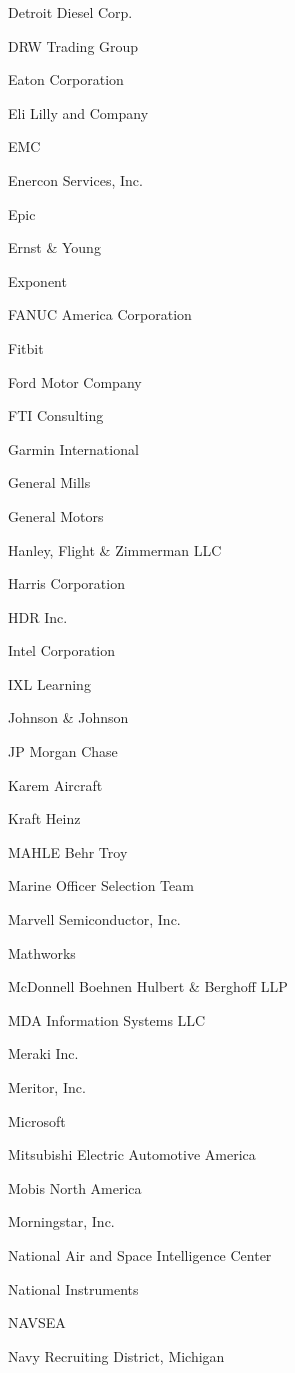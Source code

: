 \documentclass[twoside]{article}
\begin{document}
\begin{center}
\begin{multicols}{5}
\begin{FlushLeft}
\begin{compactitem}
\item Detroit Diesel Corp.
\item DRW Trading Group
\item Eaton Corporation
\item Eli Lilly and Company
\item EMC
\item Enercon Services, Inc.
\item Epic
\item Ernst \& Young
\item Exponent
\item FANUC America Corporation
\item Fitbit
\item Ford Motor Company
\item FTI Consulting
\item Garmin International
\item General Mills
\item General Motors
\item Hanley, Flight \& Zimmerman LLC
\item Harris Corporation
\item HDR Inc.
\item Intel Corporation
\item IXL Learning
\item Johnson \& Johnson
\item JP Morgan Chase
\item Karem Aircraft
\item Kraft Heinz
\item MAHLE Behr Troy
\item Marine Officer Selection Team
\item Marvell Semiconductor, Inc.
\item Mathworks
\item McDonnell Boehnen Hulbert \& Berghoff LLP
\item MDA Information Systems LLC
\item Meraki Inc.
\item Meritor, Inc.
\item Microsoft
\item Mitsubishi Electric Automotive America
\item Mobis North America
\item Morningstar, Inc.
\item National Air and Space Intelligence Center
\item National Instruments
\item NAVSEA
\item Navy Recruiting District, Michigan

\end{compactitem}
\end{FlushLeft}
\end{multicols}
\end{center}
\end{document}
